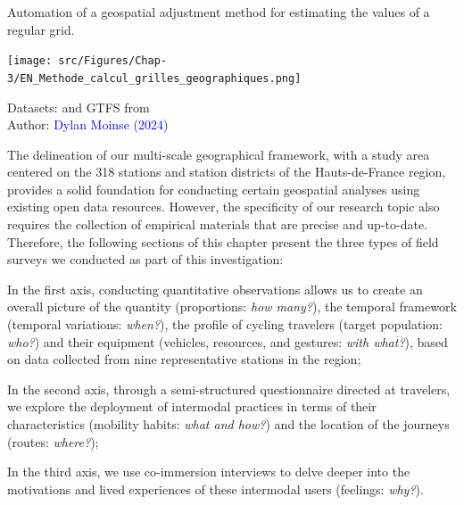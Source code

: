 \begin{refsegment}
\begin{carte}[h!]\vspace*{4pt}
    \caption{Automation of a geospatial adjustment method for estimating the values of a regular grid.}
    \label{fig-chap3:methode-calcul-grilles-geographiques}
    \centerline{\texttt{[image: src/Figures/Chap-3/EN\_Methode\_calcul\_grilles\_geographiques.png]}}
    \vspace{5pt}
    \begin{flushright}\scriptsize{
    Datasets: \textcolor{blue}{\textcite{openstreetmap_openstreetmap_2023}} and \acrshort{GTFS} from \textcolor{blue}{\textcite{sncf_reseau_2024}}
    \\
    Author: \textcolor{blue}{Dylan Moinse (2024)}
    }\end{flushright}
\end{carte}

The delineation of our multi-scale geographical framework, with a study area centered on the 318 stations and station districts of the Hauts-de-France region, provides a solid foundation for conducting certain geospatial analyses using existing open data resources. However, the specificity of our research topic also requires the collection of empirical materials that are precise and up-to-date. Therefore, the following sections of this chapter present the three types of field surveys we conducted as part of this investigation:
    \begin{customitemize}
\item In the first axis, conducting quantitative observations allows us to create an overall picture of the quantity (proportions: \textsl{how many?}), the temporal framework (temporal variations: \textsl{when?}), the profile of cycling travelers (target population: \textsl{who?}) and their equipment (vehicles, resources, and gestures: \textsl{with what?}), based on data collected from nine representative stations in the region;
\item In the second axis, through a semi-structured questionnaire directed at travelers, we explore the deployment of intermodal practices in terms of their characteristics (mobility habits: \textsl{what and how?}) and the location of the journeys (routes: \textsl{where?});
\item In the third axis, we use co-immersion interviews to delve deeper into the motivations and lived experiences of these intermodal users (feelings: \textsl{why?}).
    \end{customitemize}%


\end{refsegment}
